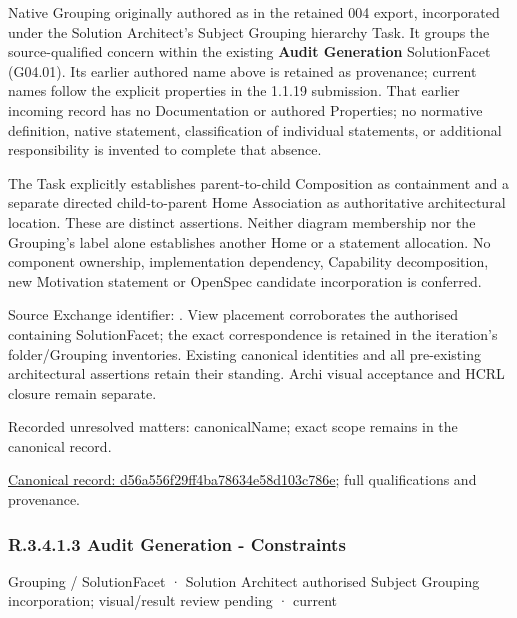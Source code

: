 Native Grouping originally authored as \texttt{} in the retained 004 export,
incorporated under the Solution Architect's Subject Grouping hierarchy Task.
It groups the source-qualified \texttt{} concern within
the existing \textbf{Audit Generation} SolutionFacet (G04.01). Its earlier authored name above is retained as provenance; current names
follow the explicit properties in the 1.1.19 submission.
That earlier incoming record has no Documentation or authored Properties; no normative
definition, native statement, classification of individual statements, or
additional responsibility is invented to complete that absence.



The Task explicitly establishes parent-to-child Composition as containment and
a separate directed child-to-parent Home Association as authoritative architectural
location. These are distinct assertions. Neither diagram membership nor the
Grouping's label alone establishes another Home or a statement allocation.
No component ownership, implementation dependency, Capability decomposition,
new Motivation statement or OpenSpec candidate incorporation is conferred.



Source Exchange identifier: \texttt{}. View placement corroborates
the authorised containing SolutionFacet; the exact correspondence is retained in the
iteration's folder/Grouping inventories. Existing canonical identities and all
pre-existing architectural assertions retain their standing. Archi visual
acceptance and HCRL closure remain separate.


{\small Recorded unresolved matters: canonicalName; exact scope remains in the canonical record.}\par
{\footnotesize \href{../../../../../../../continuum/grouping/d56a556f29ff4ba78634e58d103c786e.md}{Canonical record: d56a556f29ff4ba78634e58d103c786e}; full qualifications and provenance.}\par
\subsubsection*{R.3.4.1.3 Audit Generation - Constraints}
\label{navigation:R.3.4.1.3}

\label{element:aeb3b98e54124d94b4a68ab18de60514}
{\small Grouping / SolutionFacet · Solution Architect authorised Subject Grouping incorporation; visual/result review pending · current}\par

